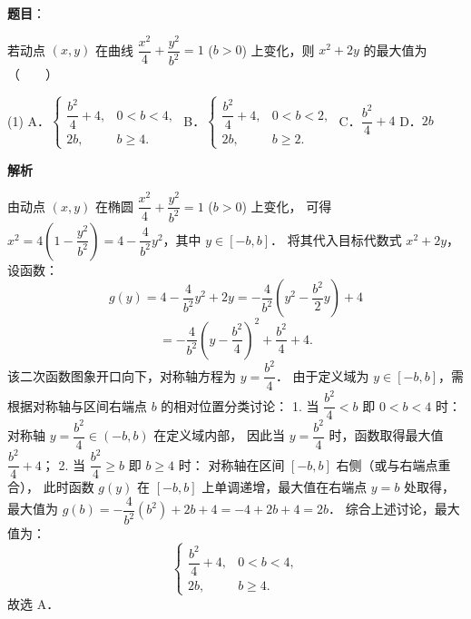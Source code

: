\begin{answer}

\textbf{题目}：

若动点 $(x, y)$ 在曲线 $\dfrac{x^2}{4} + \dfrac{y^2}{b^2} = 1$ ($b > 0$) 上变化，则 $x^2 + 2y$ 的最大值为\mbox{（　　）}

\begin{gkopts}(1)
\task A．$\begin{cases} \dfrac{b^2}{4} + 4, & 0 < b < 4, \\ 2b, & b \geqslant 4. \end{cases}$
\task B．$\begin{cases} \dfrac{b^2}{4} + 4, & 0 < b < 2, \\ 2b, & b \geqslant 2. \end{cases}$
\task C．$\dfrac{b^2}{4} + 4$
\task D．$2b$
\end{gkopts}

\textbf{解析}

由动点 $(x, y)$ 在椭圆 $\dfrac{x^2}{4} + \dfrac{y^2}{b^2} = 1$ ($b > 0$) 上变化，
可得 $x^2 = 4\left(1 - \dfrac{y^2}{b^2}\right) = 4 - \dfrac{4}{b^2}y^2$，其中 $y \in [-b, b]$．
将其代入目标代数式 $x^2 + 2y$，设函数：
\nopagebreak[4]
\[
g(y) = 4 - \frac{4}{b^2}y^2 + 2y = -\frac{4}{b^2}\left(y^2 - \frac{b^2}{2}y\right) + 4
\]
\nopagebreak[4]
\[
= -\frac{4}{b^2}\left(y - \frac{b^2}{4}\right)^2 + \frac{b^2}{4} + 4.
\]
该二次函数图象开口向下，对称轴方程为 $y = \dfrac{b^2}{4}$．
由于定义域为 $y \in [-b, b]$，需根据对称轴与区间右端点 $b$ 的相对位置分类讨论：
1. 当 $\dfrac{b^2}{4} < b$ 即 $0 < b < 4$ 时：
对称轴 $y = \dfrac{b^2}{4} \in (-b, b)$ 在定义域内部，
因此当 $y = \dfrac{b^2}{4}$ 时，函数取得最大值 $\dfrac{b^2}{4} + 4$；
2. 当 $\dfrac{b^2}{4} \geqslant b$ 即 $b \geqslant 4$ 时：
对称轴在区间 $[-b, b]$ 右侧（或与右端点重合），
此时函数 $g(y)$ 在 $[-b, b]$ 上单调递增，最大值在右端点 $y = b$ 处取得，
最大值为 $g(b) = -\dfrac{4}{b^2}(b^2) + 2b + 4 = -4 + 2b + 4 = 2b$．
综合上述讨论，最大值为：
\nopagebreak[4]
\[
\begin{cases}
\dfrac{b^2}{4} + 4, & 0 < b < 4, \\
2b, & b \geqslant 4.
\end{cases}
\]
故选 A．


\end{answer}
